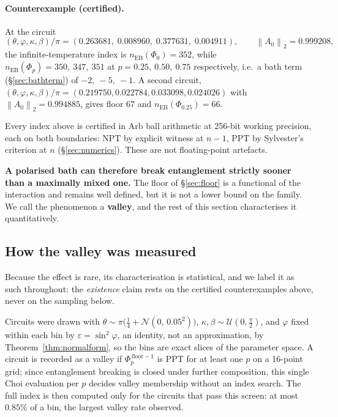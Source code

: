 \documentclass[11pt,a4paper]{article}
\theoremstyle{definition}
\theoremstyle{remark}
\newcommand{\nEB}{n_{\mathrm{EB}}}
\newcommand{\opn}[1]{\left\lVert #1 \right\rVert_{2}}
\begin{document}
\paragraph{Counterexample (certified).} At the circuit
\[
  (\theta,\varphi,\kappa,\beta)/\pi = (0.263681,\; 0.008960,\; 0.377631,\; 0.004911), \qquad \opn{A_0} = 0.999208,
\]
the infinite-temperature index is $\nEB(\Phi_0) = 352$, while $\nEB(\Phi_p) = 350,\ 347,\ 351$ at $p = 0.25,\ 0.50,\ 0.75$ respectively, i.e.\ a bath term (\S\ref{sec:bathterm}) of $-2,\ -5,\ -1$. A second circuit, $(\theta,\varphi,\kappa,\beta)/\pi = (0.219750, 0.022784, 0.033098, 0.024026)$ with $\opn{A_0} = 0.994885$, gives floor $67$ and $\nEB(\Phi_{0.25}) = 66$.

Every index above is certified in Arb ball arithmetic at 256-bit working precision, each on both boundaries: NPT by explicit witness at $n-1$, PPT by Sylvester's criterion at $n$ (\S\ref{sec:numerics}). These are not floating-point artefacts.

\textbf{A polarised bath can therefore break entanglement strictly sooner than a maximally mixed one.} The floor of \S\ref{sec:floor} is a functional of the interaction and remains well defined, but it is not a lower bound on the family. We call the phenomenon a \textbf{valley}, and the rest of this section characterises it quantitatively.

\subsection{How the valley was measured}

Because the effect is rare, its characterisation is statistical, and we label it as such throughout: the \emph{existence} claim rests on the certified counterexamples above, never on the sampling below.

Circuits were drawn with $\theta \sim \pi\big(\tfrac14 + \mathcal N(0,\,0.05^2)\big)$, $\kappa,\beta \sim \mathcal U(0,\tfrac\pi2)$, and $\varphi$ fixed within each bin by $\varepsilon = \sin^2\varphi$, an identity, not an approximation, by Theorem~\ref{thm:normalform}, so the bins are exact slices of the parameter space. A circuit is recorded as a valley if $\Phi_p^{\,\mathrm{floor}-1}$ is PPT for at least one $p$ on a 16-point grid; since entanglement breaking is closed under further composition, this single Choi evaluation per $p$ decides valley membership without an index search. The full index is then computed only for the circuits that pass this screen: at most $0.85\%$ of a bin, the largest valley rate observed.
\end{document}
